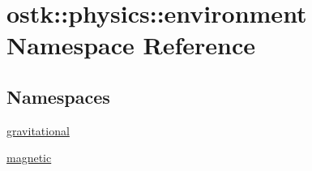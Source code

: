 \hypertarget{namespaceostk_1_1physics_1_1environment}{}\section{ostk\+:\+:physics\+:\+:environment Namespace Reference}
\label{namespaceostk_1_1physics_1_1environment}
\subsection*{Namespaces}
\begin{DoxyCompactItemize}
\item 
 \hyperlink{namespaceostk_1_1physics_1_1environment_1_1gravitational}{gravitational}
\item 
 \hyperlink{namespaceostk_1_1physics_1_1environment_1_1magnetic}{magnetic}
\end{DoxyCompactItemize}
